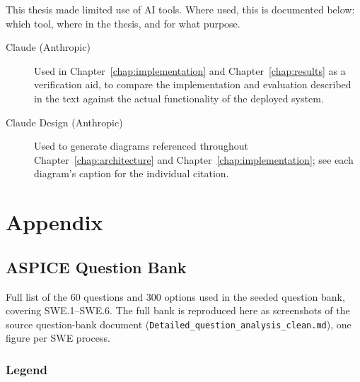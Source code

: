 \documentclass[a4paper, 12pt, oneside, openany, BCOR1cm,toc=chapterentrywithdots]{scrbook}
\begin{document}





\label{app:ai-referencing}

This thesis made limited use of AI tools. Where used, this is documented below: which tool, where
in the thesis, and for what purpose.

\begin{description}
  \item[Claude (Anthropic)] Used in Chapter~\ref{chap:implementation} and
  Chapter~\ref{chap:results} as a verification aid, to compare the implementation and evaluation
  described in the text against the actual functionality of the deployed system.
  \item[Claude Design (Anthropic)~\cite{anthropic_claude_design}] Used to generate diagrams
  referenced throughout Chapter~\ref{chap:architecture} and Chapter~\ref{chap:implementation};
  see each diagram's caption for the individual citation.
\end{description}


\appendix
\part*{Appendix}

\chapter{ASPICE Question Bank}
\label{app:questionbank}
Full list of the 60 questions and 300 options used in the seeded question bank, covering
SWE.1--SWE.6. The full bank is reproduced here as screenshots of the source question-bank
document (\texttt{Detailed\_question\_analysis\_clean.md}), one figure per SWE process.

\section*{Legend}
\end{document}
